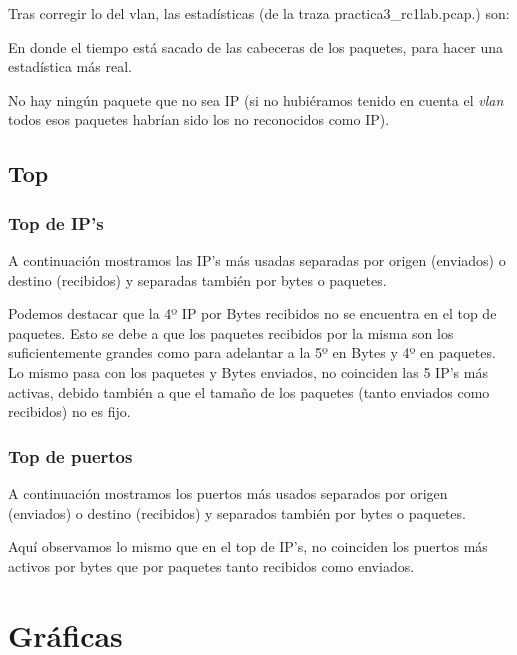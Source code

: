 \documentclass[nochap]{apuntes}
\begin{document}
Tras corregir lo del vlan, las estadísticas (de la traza practica3\_rc1lab.pcap.) son:


En donde el tiempo está sacado de las cabeceras de los paquetes, para hacer una estadística más real.

No hay ningún paquete que no sea IP (si no hubiéramos tenido en cuenta el \emph{vlan} todos esos paquetes habrían sido los no reconocidos como IP).

\subsection{Top}

\subsubsection{Top de IP's}

A continuación mostramos las IP's más usadas separadas por origen (enviados) o destino (recibidos) y separadas también por bytes o paquetes.


Podemos destacar que la 4º IP por Bytes recibidos no se encuentra en el top de paquetes. Esto se debe a que los paquetes recibidos por la misma son los suficientemente grandes como para adelantar a la 5º en Bytes y 4º en paquetes. Lo mismo pasa con los paquetes y Bytes enviados, no coinciden las 5 IP's más activas, debido también a que el tamaño de los paquetes (tanto enviados como recibidos) no es fijo.

\newpage
\subsubsection{Top de puertos}

A continuación mostramos los puertos más usados separados por origen (enviados) o destino (recibidos) y separados también por bytes o paquetes.


Aquí observamos lo mismo que en el top de IP's, no coinciden los puertos más activos por bytes que por paquetes tanto recibidos como enviados.


\section{Gr\'aficas}
\end{document}
